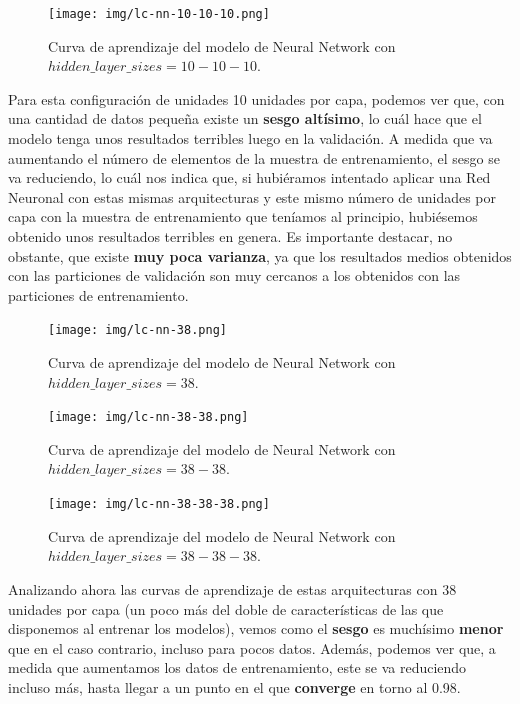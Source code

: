 \documentclass[11pt,a4paper]{article}
\begin{document}
\begin{figure}[H]
    \centering
    \texttt{[image: img/lc-nn-10-10-10.png]}
    \caption{Curva de aprendizaje del modelo de Neural Network con $hidden\_layer\_sizes=10-10-10$.}
    \label{fig:lc-nn-10-10-10}
\end{figure}

Para esta configuración de unidades 10 unidades por capa, podemos ver que, con una cantidad de datos pequeña existe un \textbf{sesgo altísimo}, lo cuál hace
que el modelo tenga unos resultados terribles luego en la validación. A medida que va aumentando el número de elementos de la muestra de
entrenamiento, el sesgo se va reduciendo, lo cuál nos indica que, si hubiéramos intentado aplicar una Red Neuronal con estas mismas arquitecturas
y este mismo número de unidades por capa con la muestra de entrenamiento que teníamos al principio, hubiésemos obtenido unos resultados terribles
en genera. Es importante destacar, no obstante, que existe \textbf{muy poca varianza}, ya que los resultados medios obtenidos con las particiones de
validación son muy cercanos a los obtenidos con las particiones de entrenamiento.

\begin{figure}[H]
\centering
\begin{minipage}{.5\textwidth}
    \centering
    \texttt{[image: img/lc-nn-38.png]}
    \caption{Curva de aprendizaje del modelo de Neural Network con $hidden\_layer\_sizes=38$.}
    \label{fig:lc-nn-38}
\end{minipage}%
\begin{minipage}{.5\textwidth}
    \centering
    \texttt{[image: img/lc-nn-38-38.png]}
    \caption{Curva de aprendizaje del modelo de Neural Network con $hidden\_layer\_sizes=38-38$.}
    \label{fig:lc-nn-38-38}
\end{minipage}
\end{figure}

\begin{figure}[H]
    \centering
    \texttt{[image: img/lc-nn-38-38-38.png]}
    \caption{Curva de aprendizaje del modelo de Neural Network con $hidden\_layer\_sizes=38-38-38$.}
    \label{fig:lc-nn-38-38-38}
\end{figure}

Analizando ahora las curvas de aprendizaje de estas arquitecturas con 38 unidades por capa (un poco más del doble de características de las
que disponemos al entrenar los modelos), vemos como el \textbf{sesgo} es muchísimo \textbf{menor} que en el caso contrario, incluso para pocos datos. 
Además, podemos ver que, a medida que aumentamos los datos de entrenamiento, este se va reduciendo incluso más, hasta llegar a un punto en el que
\textbf{converge} en torno al 0.98.
\end{document}
